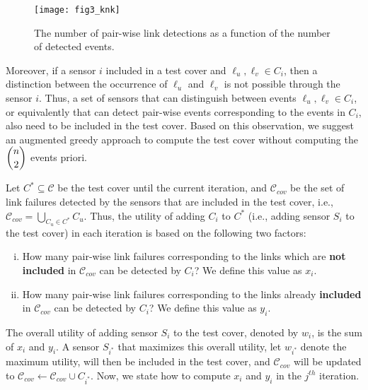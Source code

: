\documentclass[twocolumn]{autart}
\begin{document}
\begin{figure}[ht]
\centering
\texttt{[image: fig3\_knk]}
\caption{The number of pair-wise link detections as a function of the number of detected events.}
\label{fig:knk}
\end{figure}

Moreover, if a sensor $i$ included in a test cover and $\ell_u,\ell_v \in C_i$, then a distinction between the occurrence of $\ell_u$ and $\ell_v$ is not possible through the sensor $i$.
Thus, a set of sensors that can distinguish between events $\ell_u,\ell_v\in C_i$, or equivalently that can detect pair-wise events corresponding to the events in $C_i$, also need to be included in the test cover. Based on this observation, we suggest an augmented greedy approach to compute the test cover without computing the $\dbinom{n}{2}$ events priori. \vspace{-0.25cm}

Let $C^{\ast}\subseteq\mathcal{C}$ be the test cover until the current iteration, and $\mathcal{C}_{cov}$ be the set of link failures detected by the sensors that are included in the test cover, i.e., $\mathcal{C}_{cov} = \bigcup\limits_{C_u\in C^\ast}C_u$. Thus, the utility of adding $C_i$ to $C^\ast$ (i.e., adding sensor $S_i$ to the test cover) in each iteration is based on the following two factors: \vspace{-0.15cm}


\begin{enumerate}[(i)]
\item How many pair-wise link failures corresponding to the links which are \textbf{not included} in $\mathcal{C}_{cov}$ can be detected by $C_i$? We define this value as $x_i$.
\item How many pair-wise link failures corresponding to the links already \textbf{included} in $\mathcal{C}_{cov}$ can be detected by $C_i$? We define this value as $y_i$.
\end{enumerate}

The overall utility of adding sensor $S_i$ to the test cover, denoted by $w_i$, is the sum of $x_i$ and $y_i$. A sensor $S_{i^\ast}$ that maximizes this overall utility, let $w_{i^\ast}$ denote the maximum utility, will then be included in the test cover, and $\mathcal{C}_{cov}$ will be updated to $\mathcal{C}_{cov}\gets \mathcal{C}_{cov}\cup C_{i^\ast}$. Now, we state how to compute $x_i$ and $y_i$ in the $j^{th}$ iteration. \vspace{-0.25cm}
\end{document}
